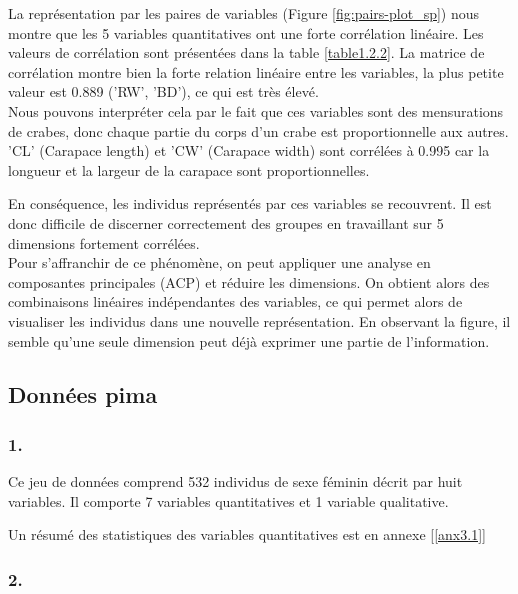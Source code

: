 \documentclass{article}
\begin{document}
La représentation par les paires de variables (Figure \ref{fig:pairs-plot_sp}) nous montre que les 5 variables quantitatives ont une forte corrélation linéaire. Les valeurs de corrélation sont présentées dans la table \lbrack\ref{table1.2.2}\rbrack. La matrice de corrélation montre bien la forte relation linéaire entre les variables, la plus petite valeur est 0.889 ('RW', 'BD'), ce qui est très élevé.\\
Nous pouvons interpréter cela par le fait que ces variables sont des mensurations de crabes, donc chaque partie du corps d'un crabe est proportionnelle aux autres. 'CL' (Carapace length) et 'CW' (Carapace width) sont corrélées à 0.995 car la longueur et la largeur de la carapace sont proportionnelles.

En conséquence, les individus représentés par ces variables se recouvrent. Il est donc difficile de discerner correctement des groupes en travaillant sur 5 dimensions fortement corrélées.\\ Pour s'affranchir de ce phénomène, on peut appliquer une analyse en composantes principales (ACP) et réduire les dimensions. On obtient alors des combinaisons linéaires indépendantes des variables, ce qui permet alors de visualiser les individus dans une nouvelle représentation. En observant la figure, il semble qu'une seule dimension peut déjà exprimer une partie de l'information.


\subsection{Données pima}
\subsubsection*{1.}\label{1.3.1}
Ce jeu de données comprend 532 individus de sexe féminin décrit par huit variables. Il comporte 7 variables quantitatives et 1 variable qualitative.

Un résumé des statistiques des variables quantitatives est en annexe [\ref{anx3.1}]

\subsubsection*{2.}\label{1.3.2}
\end{document}
